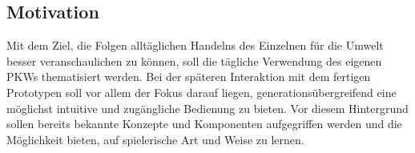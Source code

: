 \documentclass[.../Dokumentation.tex]{subfiles}
\begin{document}
\subsection{Motivation}\label{sec-intr-motivation}
Mit dem Ziel, die Folgen alltäglichen Handelns des Einzelnen für die Umwelt 
besser veranschaulichen zu können, soll die tägliche 
Verwendung des eigenen PKWs thematisiert werden.
Bei der späteren Interaktion mit dem fertigen Prototypen soll vor 
allem der Fokus darauf liegen, generationsübergreifend eine möglichst intuitive 
und zugängliche Bedienung zu bieten.
Vor diesem Hintergrund sollen bereits bekannte Konzepte und Komponenten 
aufgegriffen werden und die Möglichkeit bieten, auf spielerische Art und 
Weise zu lernen.
\end{document}
